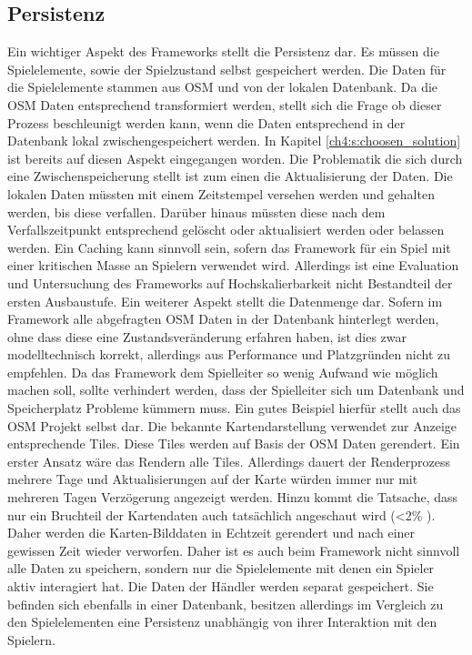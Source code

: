 \subsection*{Persistenz}

Ein wichtiger Aspekt des Frameworks stellt die Persistenz dar. Es müssen die Spielelemente, sowie der Spielzustand selbst gespeichert werden. Die Daten für die Spielelemente stammen aus OSM und von der lokalen Datenbank. Da die OSM Daten entsprechend transformiert werden, stellt sich die Frage ob dieser Prozess beschleunigt werden kann, wenn die Daten entsprechend in der Datenbank lokal zwischengespeichert werden.
In Kapitel \ref{ch4:s:choosen_solution} ist bereits auf diesen Aspekt eingegangen worden. Die Problematik die sich durch eine Zwischenspeicherung stellt ist zum einen die Aktualisierung der Daten. Die lokalen Daten müssten mit einem Zeitstempel versehen werden und gehalten werden, bis diese \glqq verfallen\grqq. Darüber hinaus müssten diese nach dem Verfallszeitpunkt entsprechend gelöscht oder aktualisiert werden oder belassen werden. Ein Caching kann sinnvoll sein, sofern das Framework für ein Spiel mit einer kritischen Masse an Spielern verwendet wird. Allerdings ist eine Evaluation und Untersuchung des Frameworks auf Hochskalierbarkeit nicht Bestandteil der ersten Ausbaustufe. Ein weiterer Aspekt stellt die Datenmenge dar. Sofern im Framework alle abgefragten OSM Daten in der Datenbank hinterlegt werden, ohne dass diese eine Zustandsveränderung erfahren haben, ist dies zwar modelltechnisch korrekt, allerdings aus Performance und Platzgründen nicht zu empfehlen.
Da das Framework dem Spielleiter so wenig Aufwand wie möglich machen soll, sollte verhindert werden, dass der Spielleiter sich um Datenbank und Speicherplatz Probleme kümmern muss. Ein gutes Beispiel hierfür stellt auch das OSM Projekt selbst dar. Die bekannte Kartendarstellung verwendet zur Anzeige entsprechende Tiles. Diese Tiles werden auf Basis der OSM Daten gerendert. Ein erster Ansatz wäre das Rendern alle Tiles.
Allerdings dauert der Renderprozess mehrere Tage und Aktualisierungen auf der Karte würden immer nur mit mehreren Tagen Verzögerung angezeigt werden. Hinzu kommt die Tatsache, dass nur ein Bruchteil der Kartendaten auch tatsächlich angeschaut wird (<2\% \cite{Haklay.2008}). Daher werden die Karten-Bilddaten in Echtzeit gerendert und nach einer gewissen Zeit wieder verworfen.
Daher ist es auch beim Framework nicht sinnvoll alle Daten zu speichern, sondern nur die Spielelemente mit denen ein Spieler aktiv interagiert hat.
Die Daten der Händler werden separat gespeichert. Sie befinden sich ebenfalls in einer Datenbank, besitzen allerdings im Vergleich zu den Spielelementen eine Persistenz unabhängig von ihrer Interaktion mit den Spielern.


